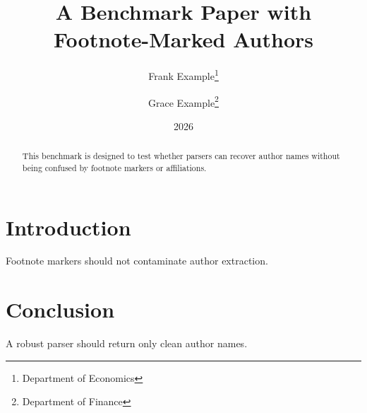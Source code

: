 \documentclass[11pt]{article}
\title{A Benchmark Paper with Footnote-Marked Authors}
\author{Frank Example\thanks{Department of Economics} \and Grace Example\thanks{Department of Finance}}
\date{2026}
\begin{document}
\maketitle
\begin{abstract}
This benchmark is designed to test whether parsers can recover author names without being confused by footnote markers or affiliations.
\end{abstract}
\section{Introduction}
Footnote markers should not contaminate author extraction.
\section{Conclusion}
A robust parser should return only clean author names.
\end{document}
